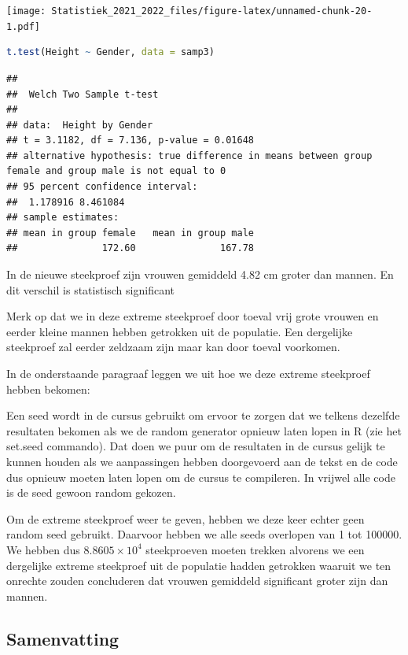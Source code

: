 \documentclass[
  12pt,dutch,coursenotes]{book}
\theoremstyle{definition}
\theoremstyle{definition}
\theoremstyle{definition}
\theoremstyle{definition}
\theoremstyle{remark}
\begin{document}
\texttt{[image: Statistiek\_2021\_2022\_files/figure-latex/unnamed-chunk-20-1.pdf]}

\begin{lstlisting}[language=R]
t.test(Height ~ Gender, data = samp3)
\end{lstlisting}

\begin{lstlisting}
## 
##  Welch Two Sample t-test
## 
## data:  Height by Gender
## t = 3.1182, df = 7.136, p-value = 0.01648
## alternative hypothesis: true difference in means between group female and group male is not equal to 0
## 95 percent confidence interval:
##  1.178916 8.461084
## sample estimates:
## mean in group female   mean in group male 
##               172.60               167.78
\end{lstlisting}

In de nieuwe steekproef zijn vrouwen gemiddeld 4.82 cm groter dan mannen. En dit verschil is statistisch significant

Merk op dat we in deze extreme steekproef door toeval vrij grote vrouwen en eerder kleine mannen hebben getrokken uit de populatie. Een dergelijke steekproef zal eerder zeldzaam zijn maar kan door toeval voorkomen.

In de onderstaande paragraaf leggen we uit hoe we deze extreme steekproef hebben bekomen:

Een seed wordt in de cursus gebruikt om ervoor te zorgen dat we telkens dezelfde resultaten bekomen als we de random generator opnieuw laten lopen in R (zie het set.seed commando). Dat doen we puur om de resultaten in de cursus gelijk te kunnen houden als we aanpassingen hebben doorgevoerd aan de tekst en de code dus opnieuw moeten laten lopen om de cursus te compileren. In vrijwel alle code is de seed gewoon random gekozen.

Om de extreme steekproef weer te geven, hebben we deze keer echter geen random seed gebruikt. Daarvoor hebben we alle seeds overlopen van 1 tot 100000. We hebben dus \ensuremath{8.8605\times 10^{4}} steekproeven moeten trekken alvorens we een dergelijke extreme steekproef uit de populatie hadden getrokken waaruit we ten onrechte zouden concluderen dat vrouwen gemiddeld significant groter zijn dan mannen.

\hypertarget{samenvatting}{%
\subsection{Samenvatting}\label{samenvatting}}
\end{document}

